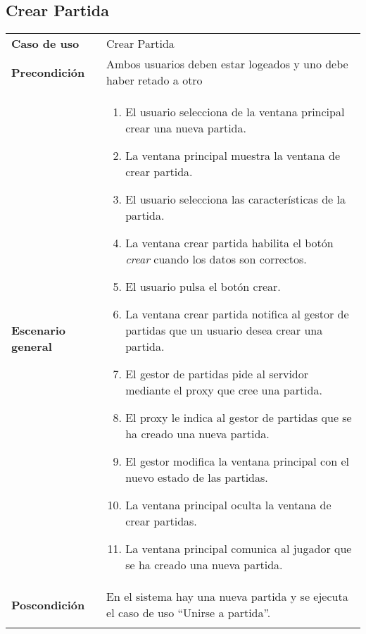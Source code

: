 \subsection{Crear Partida}
{\footnotesize
\begin{tabularx}{0.95\textwidth}{p{}|X}

\textbf{Caso de uso} & Crear Partida \\

\textbf{Precondición} & Ambos usuarios deben estar logeados y uno debe haber retado a otro \\

\textbf{Escenario general} & \begin{enumerate}
\item El usuario selecciona de la ventana principal crear una nueva partida.
\item La ventana principal muestra la ventana de crear partida.
\item El usuario selecciona las características de la partida.
\item La ventana crear partida habilita el botón \emph{crear} cuando los datos
son correctos.
\item El usuario pulsa el botón crear.
\item La ventana crear partida notifica al gestor de partidas que un usuario
desea crear una partida.
\item El gestor de partidas pide al servidor mediante el proxy que cree una
partida.
\item El proxy le indica al gestor de partidas que se ha creado una nueva
partida.
\item El gestor modifica la ventana principal con el nuevo estado de las
partidas.
\item La ventana principal oculta la ventana de crear partidas.
\item La ventana principal comunica al jugador que se ha creado una nueva
partida.
\end{enumerate} \\

\textbf{Poscondición} & En el sistema hay una nueva partida y se ejecuta el caso
 de uso ``Unirse a partida''.\\ \\


\end{tabularx}}
